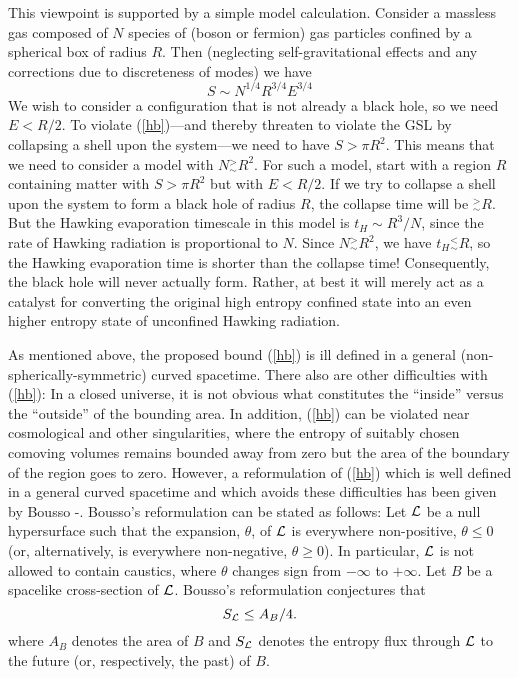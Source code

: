 \documentclass[12pt]{article}
\begin{document}
This viewpoint is supported by a simple model calculation.  Consider a
massless gas composed of $N$ species of (boson or fermion) gas
particles confined by a spherical box of radius $R$. Then (neglecting
self-gravitational effects and any corrections due to discreteness of
modes) we have
\begin{equation}
S \sim N^{1/4} R^{3/4} E^{3/4}
\label{sgas}
\end{equation}
We wish to consider a configuration that is not already a black hole,
so we need $E < R/2$. To violate (\ref{hb})---and thereby threaten to
violate the GSL by collapsing a shell upon the system---we need to
have $S > \pi R^2$. This means that we need to consider a model with
$N \mathrel{{}^>_\sim} R^2$. For such a model, start with a region $R$
containing matter with $S > \pi R^2$ but with $E < R/2$. If we try to
collapse a shell upon the system to form a black hole of radius $R$,
the collapse time will be $\mathrel{{}^>_\sim} R$. But the Hawking
evaporation timescale in this model is $t_H \sim R^3/N$, since the rate
of Hawking radiation is proportional to $N$. Since $N
\mathrel{{}^>_\sim} R^2$, we have $t_H \mathrel{{}^<_\sim} R$, so the
Hawking evaporation time is shorter than the collapse
time! Consequently, the black hole will never actually form. Rather,
at best it will merely act as a catalyst for converting the original high
entropy confined state into an even higher entropy state of unconfined
Hawking radiation.

As mentioned above, the proposed bound (\ref{hb}) is ill defined in a
general (non-spherically-symmetric) curved spacetime. There also are
other difficulties with (\ref{hb}): In a closed universe, it is not
obvious what constitutes the ``inside'' versus the ``outside'' of the
bounding area. In addition, (\ref{hb}) can be violated near
cosmological and other singularities, where the entropy of suitably
chosen comoving volumes remains bounded away from zero but the area of
the boundary of the region goes to zero.  However, a reformulation of
(\ref{hb}) which is well defined in a general curved spacetime and
which avoids these difficulties has been given by Bousso
\cite{bo1}-\cite{bo3}. Bousso's reformulation can be stated as
follows: Let ${\cal L}$ be a null hypersurface such that the
expansion, $\theta$, of ${\cal L}$ is everywhere non-positive, $\theta
\leq 0$ (or, alternatively, is everywhere non-negative, $\theta \geq
0$). In particular, ${\cal L}$ is not allowed to contain caustics,
where $\theta$ changes sign from $- \infty$ to $+\infty$. Let $B$ be a
spacelike cross-section of $\cal L$. Bousso's reformulation
conjectures that
\begin{equation}
S_{\cal L} \leq A_B/4 .
\label{bb}
\end{equation}
where $A_B$ denotes the area of $B$ and $S_{\cal L}$ denotes the
entropy flux through ${\cal L}$ to the future (or, respectively, the
past) of $B$.
\end{document}
